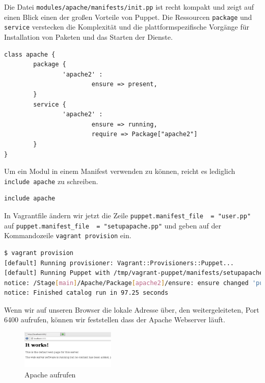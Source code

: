 \documentclass[12pt,a4paper,ngerman]{article}
\begin{document}
Die Datei \lstinline$modules/apache/manifests/init.pp$ ist recht kompakt und zeigt auf einen Blick einen der großen Vorteile von Puppet. Die Ressourcen \lstinline$package$ und \lstinline$service$ verstecken die Komplexität und die plattformspezifische Vorgänge für Installation von Paketen und das Starten der Dienste.
\begin{lstlisting}[language=puppet,caption=Inhalt von modules/apache/manifests/init.pp, label=apache-init.pp]
class apache {
        package {
                'apache2' :
                        ensure => present,
        }
        service {
                'apache2' :
                        ensure => running,
                        require => Package["apache2"]
        }
}
\end{lstlisting}

Um ein Modul in einem Manifest verwenden zu können, reicht es lediglich \lstinline$include apache$ zu schreiben.
\begin{lstlisting}[language=puppet,caption=Inhalt von manifests/setupapache.pp, label=setupapache.pp]
include apache
\end{lstlisting}

In Vagrantfile ändern wir jetzt die Zeile \lstinline$puppet.manifest_file  = "user.pp"$ auf \lstinline$puppet.manifest_file  = "setupapache.pp"$ und geben auf der Kommandozeile \lstinline$vagrant provision$ ein.

\begin{lstlisting}[language=sh,caption=vagrant provisioning für Apache, label=provisioning_apache]
$ vagrant provision
[default] Running provisioner: Vagrant::Provisioners::Puppet...
[default] Running Puppet with /tmp/vagrant-puppet/manifests/setupapache.pp...
notice: /Stage[main]/Apache/Package[apache2]/ensure: ensure changed 'purged' to 'present'
notice: Finished catalog run in 97.25 seconds
\end{lstlisting}

Wenn wir auf unseren Browser die lokale Adresse über, den weitergeleiteten, Port 6400 aufrufen, können wir feststellen dass der Apache Webserver läuft.
\begin{figure}
  \begin{center}
    \includegraphics[width=0.4\textwidth]{images/apache.pdf}
  \end{center}
  \caption{Apache aufrufen}
  \label{apache}
\end{figure}
\end{document}

